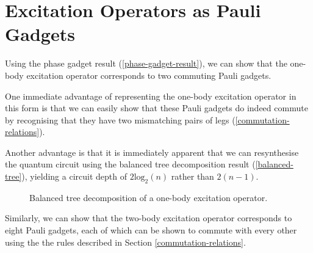 \section{Excitation Operators as Pauli Gadgets}

Using the phase gadget result (\ref{phase-gadget-result}), we can show that the one-body excitation operator corresponds to two commuting Pauli gadgets.


One immediate advantage of representing the one-body excitation operator in this form is that we can easily show that these Pauli gadgets do indeed commute by recognising that they have two mismatching pairs of legs (\ref{commutation-relations}).

Another advantage is that it is immediately apparent that we can resynthesise the quantum circuit using the balanced tree decomposition result (\ref{balanced-tree}), yielding a circuit depth of $2\text{log}_2(n)$ rather than $2(n-1)$.

\begin{figure}[H]
    \centering
    \caption{Balanced tree decomposition of a one-body excitation operator.}
\end{figure}

Similarly, we can show that the two-body excitation operator corresponds to eight Pauli gadgets, each of which can be shown to commute with every other using the the rules described in Section \ref{commutation-relations}.

